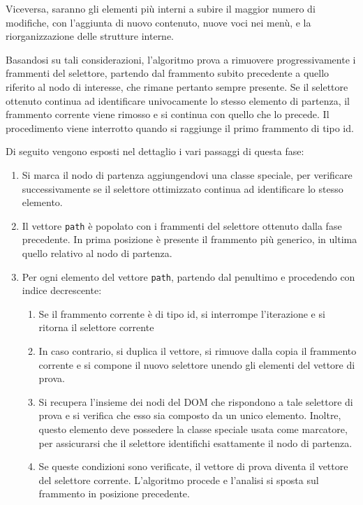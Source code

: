 Viceversa, saranno gli elementi più interni a subire il maggior numero di modifiche, con l'aggiunta di nuovo contenuto, nuove voci nei menù, e la riorganizzazione delle strutture interne.

Basandosi su tali considerazioni, l'algoritmo prova a rimuovere progressivamente i frammenti del selettore, partendo dal frammento subito precedente a quello riferito al nodo di interesse, che rimane pertanto sempre presente. Se il selettore ottenuto continua ad identificare univocamente lo stesso elemento di partenza, il frammento corrente viene rimosso e si continua con quello che lo precede. Il procedimento viene interrotto quando si raggiunge il primo frammento di tipo id.

Di seguito vengono esposti nel dettaglio i vari passaggi di questa fase:

\begin{enumerate}
\item Si marca il nodo di partenza aggiungendovi una classe speciale, per verificare successivamente se il selettore ottimizzato continua ad identificare lo stesso elemento.
\item Il vettore \verb|path| è popolato con i frammenti del selettore ottenuto dalla fase precedente. In prima posizione è presente il frammento più generico, in ultima quello relativo al nodo di partenza.   
\item Per ogni elemento del vettore \verb|path|, partendo dal penultimo e procedendo con indice decrescente:
	\begin{enumerate}
		\item Se il frammento corrente è di tipo id, si interrompe l'iterazione e si ritorna il selettore corrente
		\item In caso contrario, si duplica il vettore, si rimuove dalla copia il frammento corrente e si compone il nuovo selettore unendo gli elementi del vettore di prova.
		\item Si recupera l'insieme dei nodi del DOM che rispondono a tale selettore di prova e si verifica che esso sia composto da un unico elemento. Inoltre, questo elemento deve possedere la classe speciale usata come marcatore, per assicurarsi che il selettore identifichi esattamente il nodo di partenza.
		\item Se queste condizioni sono verificate, il vettore di prova diventa il vettore del selettore corrente. L'algoritmo procede e l'analisi si sposta sul frammento in posizione precedente.
	\end{enumerate}
\end{enumerate}

